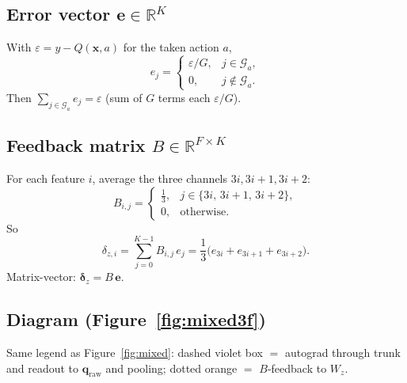 \documentclass[11pt]{article}
\begin{document}
\subsection{Error vector $\mathbf{e} \in \mathbb{R}^{K}$}
With $\varepsilon = y - Q(\mathbf{x},a)$ for the taken action $a$,
\begin{equation}
e_j = \begin{cases}
\varepsilon / G, & j \in \mathcal{G}_a,\\
0, & j \notin \mathcal{G}_a.
\end{cases}
\end{equation}
Then $\sum_{j \in \mathcal{G}_a} e_j = \varepsilon$ (sum of $G$ terms each $\varepsilon/G$).

\subsection{Feedback matrix $B \in \mathbb{R}^{F \times K}$}
For each feature $i$, average the three channels $3i, 3i+1, 3i+2$:
\begin{equation}
B_{i,j} = \begin{cases}
\frac{1}{3}, & j \in \{3i,\,3i+1,\,3i+2\},\\
0, & \text{otherwise}.
\end{cases}
\end{equation}
So
\begin{equation}
\delta_{z,i} = \sum_{j=0}^{K-1} B_{i,j}\, e_j
= \frac{1}{3}\bigl(e_{3i} + e_{3i+1} + e_{3i+2}\bigr).
\end{equation}
Matrix-vector: $\boldsymbol{\delta}_z = B\,\mathbf{e}$.

\subsection{Diagram (Figure~\ref{fig:mixed3f})}
Same legend as Figure~\ref{fig:mixed}: dashed violet box $=$ autograd through trunk and readout to $\mathbf{q}_{\mathrm{raw}}$ and pooling; dotted orange $=$ $B$-feedback to $W_z$.
\end{document}
